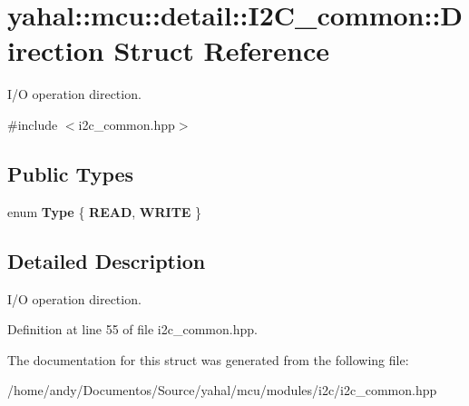 \hypertarget{structyahal_1_1mcu_1_1detail_1_1_i2_c__common_1_1_direction}{}\section{yahal\+:\+:mcu\+:\+:detail\+:\+:I2\+C\+\_\+common\+:\+:Direction Struct Reference}
\label{structyahal_1_1mcu_1_1detail_1_1_i2_c__common_1_1_direction}


I/\+O operation direction.  




{\ttfamily \#include $<$i2c\+\_\+common.\+hpp$>$}

\subsection*{Public Types}
\begin{DoxyCompactItemize}
\item 
\hypertarget{structyahal_1_1mcu_1_1detail_1_1_i2_c__common_1_1_direction_a89af520c68ce94c3904647f01be77ccd}{}enum {\bfseries Type} \{ {\bfseries R\+E\+A\+D}, 
{\bfseries W\+R\+I\+T\+E}
 \}\label{structyahal_1_1mcu_1_1detail_1_1_i2_c__common_1_1_direction_a89af520c68ce94c3904647f01be77ccd}

\end{DoxyCompactItemize}


\subsection{Detailed Description}
I/\+O operation direction. 

Definition at line 55 of file i2c\+\_\+common.\+hpp.



The documentation for this struct was generated from the following file\+:\begin{DoxyCompactItemize}
\item 
/home/andy/\+Documentos/\+Source/yahal/mcu/modules/i2c/i2c\+\_\+common.\+hpp\end{DoxyCompactItemize}
